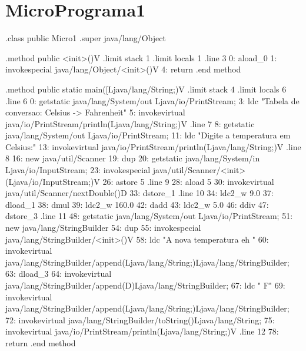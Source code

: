 \documentclass[12pt,a4paper,twoside]{report}
\begin{document}
\section{MicroPrograma1}
\begin{terminal}
.class public Micro1
.super java/lang/Object

.method public <init>()V
  .limit stack 1
  .limit locals 1
  .line 3
  0: aload_0
  1: invokespecial java/lang/Object/<init>()V
  4: return
.end method

.method public static main([Ljava/lang/String;)V
  .limit stack 4
  .limit locals 6
  .line 6
  0: getstatic java/lang/System/out Ljava/io/PrintStream;
  3: ldc "Tabela de conversao: Celsius -> Fahrenheit"
  5: invokevirtual java/io/PrintStream/println(Ljava/lang/String;)V
  .line 7
  8: getstatic java/lang/System/out Ljava/io/PrintStream;
  11: ldc "Digite a temperatura em Celsius:"
  13: invokevirtual java/io/PrintStream/println(Ljava/lang/String;)V
  .line 8
  16: new java/util/Scanner
  19: dup
  20: getstatic java/lang/System/in Ljava/io/InputStream;
  23: invokespecial java/util/Scanner/<init>(Ljava/io/InputStream;)V
  26: astore 5
  .line 9
  28: aload 5
  30: invokevirtual java/util/Scanner/nextDouble()D
  33: dstore_1
  .line 10
  34: ldc2_w 9.0
  37: dload_1
  38: dmul
  39: ldc2_w 160.0
  42: dadd
  43: ldc2_w 5.0
  46: ddiv
  47: dstore_3
  .line 11
  48: getstatic java/lang/System/out Ljava/io/PrintStream;
  51: new java/lang/StringBuilder
  54: dup
  55: invokespecial java/lang/StringBuilder/<init>()V
  58: ldc "A nova temperatura eh "
  60: invokevirtual java/lang/StringBuilder/append(Ljava/lang/String;)Ljava/lang/StringBuilder;
  63: dload_3
  64: invokevirtual java/lang/StringBuilder/append(D)Ljava/lang/StringBuilder;
  67: ldc " F"
  69: invokevirtual java/lang/StringBuilder/append(Ljava/lang/String;)Ljava/lang/StringBuilder;
  72: invokevirtual java/lang/StringBuilder/toString()Ljava/lang/String;
  75: invokevirtual java/io/PrintStream/println(Ljava/lang/String;)V
  .line 12
  78: return
.end method
\end{terminal}
\end{document}
